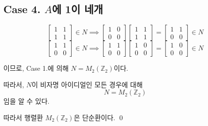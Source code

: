 \documentclass{article}
\begin{document}
\subsection{Case 4. $A$에 1이 네개}
$$
\begin{bmatrix}
1&1 \\ 
1&1
\end{bmatrix} \in N \implies
\begin{bmatrix}
1&0  \\ 
0&0
\end{bmatrix} 
\begin{bmatrix}
1&1  \\ 
1&1
\end{bmatrix} =
\begin{bmatrix}
1&1  \\ 
0&0
\end{bmatrix} \in N
$$
$$
\begin{bmatrix}
1&1 \\ 
0&0
\end{bmatrix} \in N \implies
\begin{bmatrix}
1&1  \\ 
0&0
\end{bmatrix} 
\begin{bmatrix}
1&0  \\ 
0&0
\end{bmatrix} =
\begin{bmatrix}
1&0  \\ 
0&0
\end{bmatrix} \in N
$$

이므로, Case 1.에 의해 $N = M_2 ( \mathbb{Z}_2)$이다.


따라서, $N$이 비자명 아이디얼인 모든 경우에 대해
$$N = M_2 ( \mathbb{Z}_2)$$임을 알 수 있다.

따라서 행렬환 $M_2 ( \mathbb{Z}_2)$은 단순환이다. \qed
\end{document}
